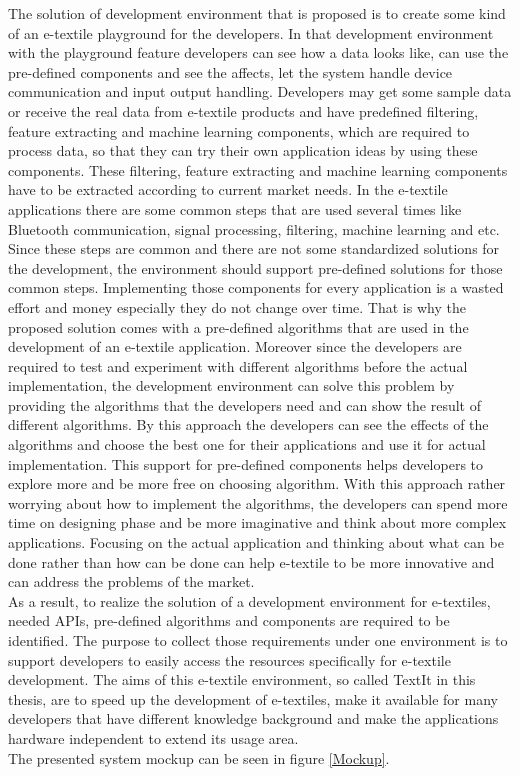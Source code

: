 The solution of development environment that is proposed is to create some kind of an e-textile playground for the developers. In that development environment with the playground feature developers can see how a data looks like, can use the pre-defined components and see the affects, let the system handle device communication and input output handling. Developers may get some sample data or receive the real data from e-textile products and have predefined filtering, feature extracting and machine learning components, which are required to process data, so that they can try their own application ideas by using these components. These filtering, feature extracting and machine learning components have to be extracted according to current market needs. In the e-textile applications there are some common steps that are used several times like Bluetooth communication, signal processing, filtering, machine learning and etc. Since these steps are common and there are not some standardized solutions for the development, the environment should support pre-defined solutions for those common steps. Implementing those components for every application is a wasted effort and money especially they do not change over time. That is why the proposed solution comes with a pre-defined algorithms that are used in the development of an e-textile application. Moreover since the developers are required to test and experiment with different algorithms before the actual implementation, the development environment can solve this problem by providing the algorithms that the developers need and can show the result of different algorithms. By this approach the developers can see the effects of the algorithms and choose the best one for their applications and use it for actual implementation. This support for pre-defined components helps developers to explore more and be more free on choosing algorithm. With this approach rather worrying about how to implement the algorithms, the developers can spend more time on designing phase and be more imaginative and think about more complex applications. Focusing on the actual application and thinking about what can be done rather than how can be done can help e-textile to be more innovative and can address the problems of the market. \\

As a result, to realize the solution of a development environment for e-textiles, needed APIs, pre-defined algorithms and components are required to be identified. The purpose to collect those requirements under one environment is to support developers to easily access the resources specifically for e-textile development. The aims of this e-textile environment, so called TextIt in this thesis, are to speed up the development of e-textiles, make it available for many developers that have different knowledge background and make the applications hardware independent to extend its usage area. \\

The presented system mockup can be seen in figure \ref{Mockup}. \\

